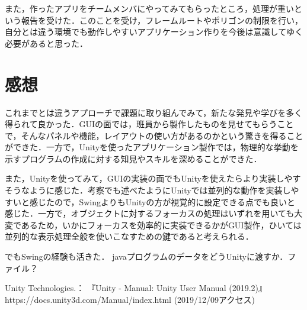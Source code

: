 \documentclass[12pt]{jarticle}
\begin{document}
また，作ったアプリをチームメンバにやってみてもらったところ，処理が重いという報告を受けた．このことを受け，フレームルートやポリゴンの制限を行い，自分とは違う環境でも動作しやすいアプリケーション作りを今後は意識してゆく必要があると思った．

\section{感想}
これまでとは違うアプローチで課題に取り組んでみて，新たな発見や学びを多く得られて良かった．GUIの面では，班員から製作したものを見せてもらうことで，そんなパネルや機能，レイアウトの使い方があるのかという驚きを得ることができた．一方で，Unityを使ったアプリケーション製作では，物理的な挙動を示すプログラムの作成に対する知見やスキルを深めることができた．

また，Unityを使ってみて，GUIの実装の面でもUnityを使えたらより実装しやすそうなように感じた．考察でも述べたようにUnityでは並列的な動作を実装しやすいと感じたので，SwingよりもUnityの方が視覚的に設定できる点でも良いと感じた．一方で，オブジェクトに対するフォーカスの処理はいずれを用いても大変であるため，いかにフォーカスを効率的に実装できるかがGUI製作，ひいては並列的な表示処理全般を使いこなすための鍵であると考えられる．


でもSwingの経験も活きた．
javaプログラムのデータをどうUnityに渡すか．ファイル？


\begin{thebibliography}{99}
Unity Technologies.： 『Unity - Manual: Unity User Manual (2019.2)』 https://docs.unity3d.com/Manual/index.html (2019/12/09アクセス) \\
\end{thebibliography}
\end{document}
